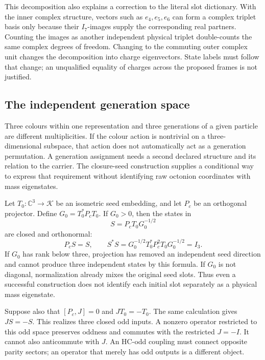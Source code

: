 \documentclass[11pt,a4paper]{article}
\begin{document}
This decomposition also explains a correction to the literal slot
dictionary. With the inner complex structure, vectors such as
$e_4,e_5,e_6$ can form a complex triplet basis only because their
$I_7$-images supply the corresponding real partners. Counting the
images as another independent physical triplet double-counts the
same complex degrees of freedom. Changing to the commuting outer
complex unit changes the decomposition into charge eigenvectors.
State labels must follow that change; an unqualified equality of
charges across the proposed frames is not justified.

\subsection{The independent generation space}
Three colours within one representation and three generations of a
given particle are different multiplicities. If the colour action is
nontrivial on a three-dimensional subspace, that action does not
automatically act as a generation permutation. A generation assignment
needs a second declared structure and its relation to the carrier.
The closure-seed construction supplies a conditional way to express
that requirement without identifying raw octonion coordinates with
mass eigenstates.

Let $T_0:\mathbb C^3\to\mathcal K$ be an isometric seed embedding,
and let $P_c$ be an orthogonal projector. Define
$G_0=T_0^*P_cT_0$. If $G_0>0$, then the states in
\begin{equation}
 S=P_cT_0G_0^{-1/2}
\end{equation}
are closed and orthonormal:
\begin{equation}
 P_cS=S,\qquad
 S^*S=G_0^{-1/2}T_0^*P_c^2T_0G_0^{-1/2}=I_3.
\end{equation}
If $G_0$ has rank below three, projection has removed an independent
seed direction and cannot produce three independent states by this
formula. If $G_0$ is not diagonal, normalization already mixes the
original seed slots. Thus even a successful construction does not
identify each initial slot separately as a physical mass eigenstate.

Suppose also that $[P_c,J]=0$ and $JT_0=-T_0$. The same calculation
gives $JS=-S$. This realizes three closed odd inputs. A nonzero
operator restricted to this odd space preserves oddness and commutes
with the restricted $J=-I$. It cannot also anticommute with $J$.
An HC-odd coupling must connect opposite parity sectors; an operator
that merely has odd outputs is a different object.
\end{document}
